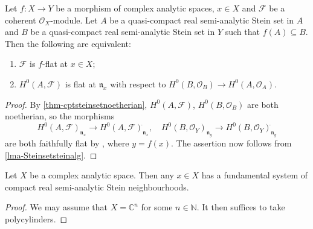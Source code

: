 \begin{corollary}\label{cor-flatiffalgflat}
    Let $f:X\rightarrow Y$ be a morphism of complex analytic spaces, $x\in X$ and $\mathcal{F}$ be a coherent $\mathcal{O}_X$-module. Let $A$ be a quasi-compact real semi-analytic Stein set in $A$ and $B$ be a quasi-compact  real semi-analytic Stein set in $Y$ such that $f(A)\subseteq B$. Then the following are equivalent:
    \begin{enumerate}
        \item $\mathcal{F}$ is $f$-flat at $x\in X$;
        \item $H^0(A,\mathcal{F})$ is flat at $\mathfrak{n}_x$ with respect to $H^0(B,\mathcal{O}_B)\rightarrow H^0(A,\mathcal{O}_A)$.
    \end{enumerate}
\end{corollary}
\begin{proof}
    By \cref{thm-cptsteinsetnoetherian}, $H^0(A,\mathcal{F})$, $H^0(B,\mathcal{O}_B)$ are both noetherian, so the morphisms 
    \[
        H^0(A,\mathcal{F})_{\mathfrak{n}_x}\rightarrow H^0(A,\mathcal{F})_{\mathfrak{n}_x}^{\hat{}},\quad  H^0(B,\mathcal{O}_Y)_{\mathfrak{n}_y}\rightarrow H^0(B,\mathcal{O}_Y)_{\mathfrak{n}_y}^{\hat{}}
    \]
    are both faithfully flat by \cite[\href{https://stacks.math.columbia.edu/tag/00MC}{Tag 00MC}]{stacks-project}, where $y=f(x)$.
    The assertion now follows from \cref{lma-Steinsetsteinalg}.
\end{proof}



\begin{lemma}\label{lma-existencesteinsemananeigh}
    Let $X$ be a complex analytic space. Then any $x\in X$ has a fundamental system of compact real semi-analytic Stein neighbourhoods.
\end{lemma}
\begin{proof}
    We may assume that $X=\mathbb{C}^n$ for some $n\in \mathbb{N}$. It then suffices to take polycylinders.
\end{proof}


